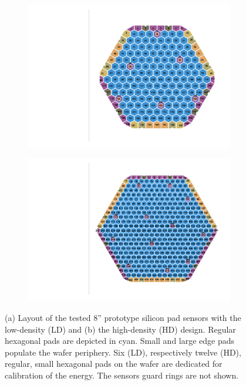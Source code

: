 \begin{figure}
	\captionsetup[subfigure]{aboveskip=-1pt,belowskip=-1pt}
	\centering
	\begin{subfigure}[b]{0.50\textwidth}
		\includegraphics[width=0.999\textwidth]{plots/ch_mapping/LD.pdf}
		\subcaption{
		}
	\end{subfigure}
	\hfill
	\begin{subfigure}[b]{0.48\textwidth}
		\includegraphics[width=0.999\textwidth]{plots/ch_mapping/HD.pdf}
		\subcaption{
		}
	\end{subfigure}    
	\caption{
        (a) Layout of the tested 8'' prototype silicon pad sensors with the low-density (LD) and (b) the high-density (HD) design.
		Regular hexagonal pads are depicted in cyan. 
		Small and large edge pads populate the wafer periphery. 
		Six (LD), respectively twelve (HD), regular, small hexagonal pads on the wafer are dedicated for calibration of the energy.
		The sensors guard rings are not shown.
	}
	\label{fig:Sensors}
\end{figure}
